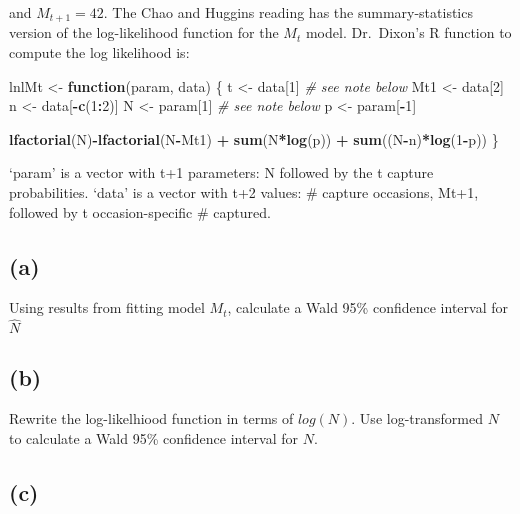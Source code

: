 \documentclass[]{article}
\newenvironment{Shaded}{\begin{snugshade}}{\end{snugshade}}
\newcommand{\KeywordTok}[1]{\textcolor[rgb]{0.13,0.29,0.53}{\textbf{#1}}}
\newcommand{\DecValTok}[1]{\textcolor[rgb]{0.00,0.00,0.81}{#1}}
\newcommand{\StringTok}[1]{\textcolor[rgb]{0.31,0.60,0.02}{#1}}
\newcommand{\CommentTok}[1]{\textcolor[rgb]{0.56,0.35,0.01}{\textit{#1}}}
\newcommand{\ControlFlowTok}[1]{\textcolor[rgb]{0.13,0.29,0.53}{\textbf{#1}}}
\newcommand{\OperatorTok}[1]{\textcolor[rgb]{0.81,0.36,0.00}{\textbf{#1}}}
\newcommand{\NormalTok}[1]{#1}
\begin{document}
and \(M_{t+1} = 42\). The Chao and Huggins reading has the
summary-statistics version of the log-likelihood function for the
\(M_t\) model. Dr.~Dixon's R function to compute the log likelihood is:

\begin{Shaded}
\begin{Highlighting}[]
\NormalTok{lnlMt <-}\StringTok{ }\ControlFlowTok{function}\NormalTok{(param, data) \{}
\NormalTok{  t <-}\StringTok{ }\NormalTok{data[}\DecValTok{1}\NormalTok{] }\CommentTok{# see note below}
\NormalTok{  Mt1 <-}\StringTok{ }\NormalTok{data[}\DecValTok{2}\NormalTok{]}
\NormalTok{  n <-}\StringTok{ }\NormalTok{data[}\OperatorTok{-}\KeywordTok{c}\NormalTok{(}\DecValTok{1}\OperatorTok{:}\DecValTok{2}\NormalTok{)]}
\NormalTok{  N <-}\StringTok{ }\NormalTok{param[}\DecValTok{1}\NormalTok{] }\CommentTok{# see note below}
\NormalTok{  p <-}\StringTok{ }\NormalTok{param[}\OperatorTok{-}\DecValTok{1}\NormalTok{]}
  
  \KeywordTok{lfactorial}\NormalTok{(N)}\OperatorTok{-}\KeywordTok{lfactorial}\NormalTok{(N}\OperatorTok{-}\NormalTok{Mt1) }\OperatorTok{+}\StringTok{ }\KeywordTok{sum}\NormalTok{(N}\OperatorTok{*}\KeywordTok{log}\NormalTok{(p)) }\OperatorTok{+}\StringTok{ }\KeywordTok{sum}\NormalTok{((N}\OperatorTok{-}\NormalTok{n)}\OperatorTok{*}\KeywordTok{log}\NormalTok{(}\DecValTok{1}\OperatorTok{-}\NormalTok{p))}
\NormalTok{\}}
\end{Highlighting}
\end{Shaded}

`param' is a vector with t+1 parameters: N followed by the t capture
probabilities. `data' is a vector with t+2 values: \# capture occasions,
Mt+1, followed by t occasion-specific \# captured.

\subsection{(a)}\label{a}

Using results from fitting model \(M_t\), calculate a Wald 95\%
confidence interval for \(\hat{N}\)

\subsection{(b)}\label{b}

Rewrite the log-likelhiood function in terms of \(log(N)\). Use
log-transformed \(N\) to calculate a Wald 95\% confidence interval for
\(N\).

\subsection{(c)}\label{c}
\end{document}
